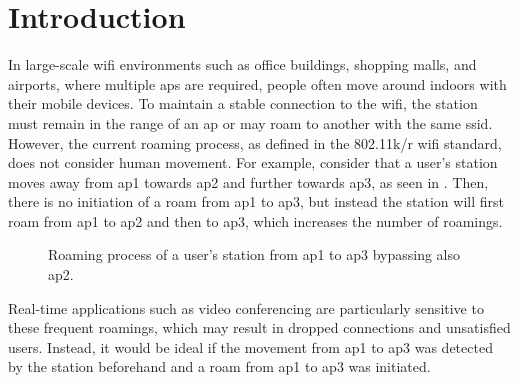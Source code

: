 \chapter{Introduction}\label{ch:intro}

In large-scale \ac{wifi} environments such as office buildings, shopping malls, and airports, where multiple \acp{ap} are required, people often move around indoors with their mobile devices.
To maintain a stable connection to the \ac{wifi}, the station must remain in the range of an \ac{ap} or may roam to another with the same \ac{ssid}.
However, the current roaming process, as defined in the 802.11k/r\cite{802.11k}\cite{802.11r} \ac{wifi} standard, does not consider human movement.
For example, consider that a user's station moves away from \ac{ap}1 towards \ac{ap}2 and further towards \ac{ap}3, as seen in .
Then, there is no initiation of a roam from \ac{ap}1 to \ac{ap}3, but instead the station will first roam from \ac{ap}1 to \ac{ap}2 and then to \ac{ap}3, which increases the number of roamings.

\begin{figure}[h]
    \centering
    
    \caption{Roaming process of a user's station from \ac{ap}1 to \ac{ap}3 bypassing also \ac{ap}2.}
    \label{fig:roaming}
\end{figure}

Real-time applications such as video conferencing are particularly sensitive to these frequent roamings, which may result in dropped connections and unsatisfied users.
Instead, it would be ideal if the movement from \ac{ap}1 to \ac{ap}3 was detected by the station beforehand and a roam from \ac{ap}1 to \ac{ap}3 was initiated.

